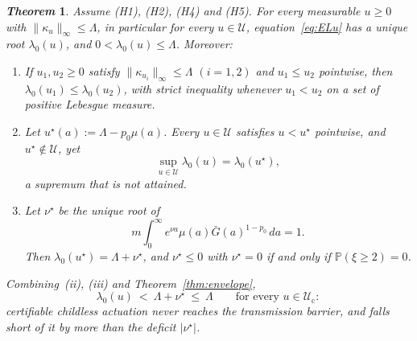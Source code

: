 \documentclass[letterpaper, 10pt, conference]{ieeeconf}
\newtheorem{theorem}{\it \textbf{Theorem}}
\newcommand{\calU}{\mathcal{U}}
\newcommand{\Lbar}{\Lambda}
\newcommand{\rev}[1]{#1}
\newcommand{\ed}[1]{#1}
\begin{document}
\begin{theorem}
\label{thm:sup}
Assume {\rm(H1), (H2), (H4)} \rev{and {\rm(H5)}. For every measurable $u\ge0$
with $\|\kappa_u\|_\infty\le\Lbar$\ed{, in particular for every $u\in\calU$,}
equation~\eqref{eq:ELu} has a unique root $\lambda_0(u)$, and
$0<\lambda_0(u)\le\Lbar$. Moreover:}
\begin{enumerate}\itemsep1pt
\item[(i)]
\rev{If $u_1,u_2\ge0$ satisfy
$\|\kappa_{u_i}\|_\infty\le\Lbar$ $(i=1,2)$
and
$u_1\le u_2$ pointwise}, then
$\lambda_0(u_1)\le\lambda_0(u_2)$, with strict inequality whenever
$u_1<u_2$ on a set of positive Lebesgue measure.
\item[(ii)]
\rev{Let $u^\star(a):=\Lbar-p_0\mu(a)$. Every $u\in\calU$ satisfies
$u<u^\star$ pointwise, and $u^\star\notin\calU$, yet}
\begin{equation}
\sup_{u\in\calU}\lambda_0(u)=\lambda_0(u^\star),
\label{eq:sup}
\end{equation}
\rev{a supremum that is not attained.}
\item[(iii)]
\rev{Let $\nu^\star$ be the unique root of}
\begin{equation}
m\int_0^\infty
e^{\nu a}\mu(a)\bar G(a)^{1-p_0}\,da=1.
\label{eq:nustar}
\end{equation}
\rev{Then $\lambda_0(u^\star)=\Lbar+\nu^\star$, and $\nu^\star\le0$ with
$\nu^\star=0$ if and only if $\mathbb P(\xi\ge2)=0$.}
\end{enumerate}
\rev{Combining~(ii), (iii) and Theorem~\ref{thm:envelope},}
\[
\lambda_0(u)\ <\ \Lbar+\nu^\star\ \le\ \Lbar
\qquad\text{for every }u\in\calU_{\mathrm c}:
\]
\rev{certifiable childless actuation never reaches the transmission barrier,
and falls short of it by more than the deficit $|\nu^\star|$.}
\end{theorem}
\end{document}
